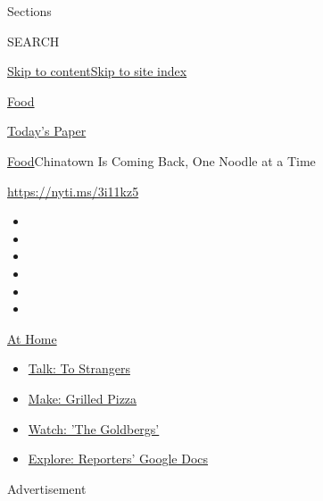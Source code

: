 Sections

SEARCH

\protect\hyperlink{site-content}{Skip to
content}\protect\hyperlink{site-index}{Skip to site index}

\href{https://www.nytimes.com/section/food}{Food}

\href{https://myaccount.nytimes.com/auth/login?response_type=cookie\&client_id=vi}{}

\href{https://www.nytimes.com/section/todayspaper}{Today's Paper}

\href{/section/food}{Food}\textbar{}Chinatown Is Coming Back, One Noodle
at a Time

\url{https://nyti.ms/3i11kz5}

\begin{itemize}
\item
\item
\item
\item
\item
\item
\end{itemize}

\href{https://www.nytimes.com/spotlight/at-home?action=click\&pgtype=Article\&state=default\&region=TOP_BANNER\&context=at_home_menu}{At
Home}

\begin{itemize}
\tightlist
\item
  \href{https://www.nytimes.com/2020/08/03/well/family/the-benefits-of-talking-to-strangers.html?action=click\&pgtype=Article\&state=default\&region=TOP_BANNER\&context=at_home_menu}{Talk:
  To Strangers}
\item
  \href{https://www.nytimes.com/2020/08/01/at-home/coronavirus-make-pizza-on-a-grill.html?action=click\&pgtype=Article\&state=default\&region=TOP_BANNER\&context=at_home_menu}{Make:
  Grilled Pizza}
\item
  \href{https://www.nytimes.com/2020/07/31/arts/television/goldbergs-abc-stream.html?action=click\&pgtype=Article\&state=default\&region=TOP_BANNER\&context=at_home_menu}{Watch:
  'The Goldbergs'}
\item
  \href{https://www.nytimes.com/interactive/2020/at-home/even-more-reporters-editors-diaries-lists-recommendations.html?action=click\&pgtype=Article\&state=default\&region=TOP_BANNER\&context=at_home_menu}{Explore:
  Reporters' Google Docs}
\end{itemize}

Advertisement

